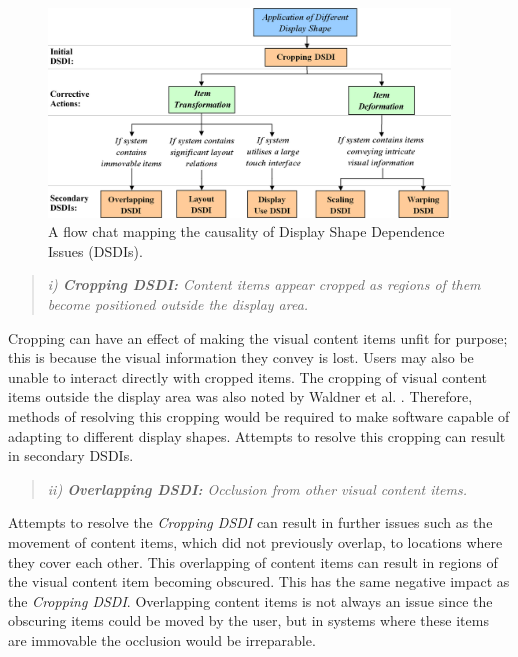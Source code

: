 \documentclass[twocolumn,compsoc]{cvm}
\begin{document}
\begin{figure}[h!]
 \centering
   \includegraphics[width=0.95\textwidth]{figures/DSDIFlowChart.jpeg}
   \caption{A flow chat mapping the causality of Display Shape Dependence Issues (DSDIs).}
   \label{fig:dsdiFlow}
\end{figure}

\begin{quote}\emph{i) \textbf{Cropping \ac{DSDI}:} Content items appear cropped as regions of them become positioned outside the display area.}\end{quote}


Cropping can have an effect of making the visual content items unfit for purpose; this is because the visual information they convey is lost.
Users may also be unable to interact directly with cropped items.
The cropping of visual content items outside the display area was also noted by Waldner et al. \cite{Waldner2011}.
Therefore, methods of resolving this cropping would be required to make software capable of adapting to different display shapes.
Attempts to resolve this cropping can result in secondary \acp{DSDI}.

\begin{quote}\emph{ii) \textbf{Overlapping \ac{DSDI}:} Occlusion from other visual content items.}\end{quote}

Attempts to resolve the {\emph{Cropping \ac{DSDI}}} can result in further issues such as the movement of content items, which did not previously overlap, to locations where they cover each other.
This overlapping of content items can result in regions of the visual content item becoming obscured.
This has the same negative impact as the {\emph{Cropping \ac{DSDI}}}.
Overlapping content items is not always an issue since the obscuring items could be moved by the user, but in systems where these items are immovable the occlusion would be irreparable.
\end{document}
